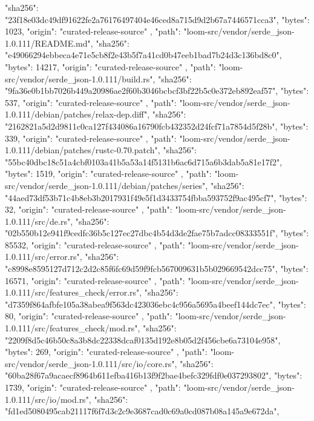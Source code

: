{{      "sha256": "23f18e03dc49df91622fe2a76176497404e46ced8a715d9d2b67a7446571cca3",
      "bytes": 1023,
      "origin": "curated-release-source"
    },
    {
      "path": "loom-src/vendor/serde_json-1.0.111/README.md",
      "sha256": "e49066294ebbeca4e71e5cb8f2e43b5f7a41cd0b47eeb1bad7b24d3c136bd8c0",
      "bytes": 14217,
      "origin": "curated-release-source"
    },
    {
      "path": "loom-src/vendor/serde_json-1.0.111/build.rs",
      "sha256": "9fa36e0b1bb7026b449a20986ae2f60b3046bcbcf3bf22b5c0e372eb892eaf57",
      "bytes": 537,
      "origin": "curated-release-source"
    },
    {
      "path": "loom-src/vendor/serde_json-1.0.111/debian/patches/relax-dep.diff",
      "sha256": "2162821a5d2d9811c0ca127f434086a16790fcb432352d24fcf71a7854d5f28b",
      "bytes": 339,
      "origin": "curated-release-source"
    },
    {
      "path": "loom-src/vendor/serde_json-1.0.111/debian/patches/rustc-0.70.patch",
      "sha256": "55bc40dbc18c51a4cbf0103a41b5a53a14f5131b6ac6d715a6b3dab5a81e17f2",
      "bytes": 1519,
      "origin": "curated-release-source"
    },
    {
      "path": "loom-src/vendor/serde_json-1.0.111/debian/patches/series",
      "sha256": "44aed73df53b71c4b8eb3b2017931f49e5f1d3433754fbba593752f9ac495cf7",
      "bytes": 32,
      "origin": "curated-release-source"
    },
    {
      "path": "loom-src/vendor/serde_json-1.0.111/src/de.rs",
      "sha256": "02b550b12e941f9cedfc36b5c127ec27dbc4b54d3de2fae75b7adcc08333551f",
      "bytes": 85532,
      "origin": "curated-release-source"
    },
    {
      "path": "loom-src/vendor/serde_json-1.0.111/src/error.rs",
      "sha256": "c8998e8595127d712c2d2c85f6fc69d59f9fcb567009631b5b029669542dcc75",
      "bytes": 16571,
      "origin": "curated-release-source"
    },
    {
      "path": "loom-src/vendor/serde_json-1.0.111/src/features_check/error.rs",
      "sha256": "d7359f864afbfe105a38abea9f563dc423036ebc4c956a5695a4beef144dc7ec",
      "bytes": 80,
      "origin": "curated-release-source"
    },
    {
      "path": "loom-src/vendor/serde_json-1.0.111/src/features_check/mod.rs",
      "sha256": "2209f8d5c46b50c8a3b8dc22338dcaf0135d192e8b05d2f456cbe6a73104e958",
      "bytes": 269,
      "origin": "curated-release-source"
    },
    {
      "path": "loom-src/vendor/serde_json-1.0.111/src/io/core.rs",
      "sha256": "60ba28f67a9acaecf8964b611efba416b13f9f2bae4befc329fdf0e037293802",
      "bytes": 1739,
      "origin": "curated-release-source"
    },
    {
      "path": "loom-src/vendor/serde_json-1.0.111/src/io/mod.rs",
      "sha256": "fd1ed5080495cab21117f6f7d3c2c9e3687cad0c69a0cd087b08a145a9e672da",
}}
